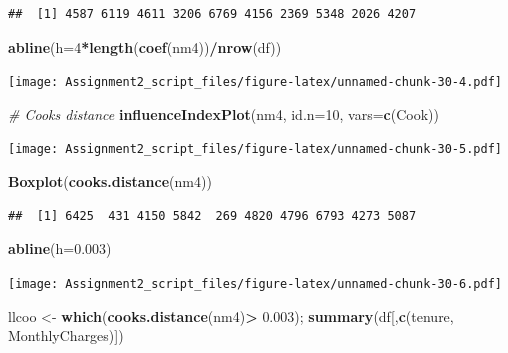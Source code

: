 \documentclass[
]{article}
\newenvironment{Shaded}{\begin{snugshade}}{\end{snugshade}}
\newcommand{\AttributeTok}[1]{\textcolor[rgb]{0.13,0.29,0.53}{#1}}
\newcommand{\CommentTok}[1]{\textcolor[rgb]{0.56,0.35,0.01}{\textit{#1}}}
\newcommand{\DecValTok}[1]{\textcolor[rgb]{0.00,0.00,0.81}{#1}}
\newcommand{\FloatTok}[1]{\textcolor[rgb]{0.00,0.00,0.81}{#1}}
\newcommand{\FunctionTok}[1]{\textcolor[rgb]{0.13,0.29,0.53}{\textbf{#1}}}
\newcommand{\NormalTok}[1]{#1}
\newcommand{\OtherTok}[1]{\textcolor[rgb]{0.56,0.35,0.01}{#1}}
\newcommand{\SpecialCharTok}[1]{\textcolor[rgb]{0.81,0.36,0.00}{\textbf{#1}}}
\newcommand{\StringTok}[1]{\textcolor[rgb]{0.31,0.60,0.02}{#1}}
\begin{document}
\begin{verbatim}
##  [1] 4587 6119 4611 3206 6769 4156 2369 5348 2026 4207
\end{verbatim}

\begin{Shaded}
\begin{Highlighting}[]
\FunctionTok{abline}\NormalTok{(}\AttributeTok{h=}\DecValTok{4}\SpecialCharTok{*}\FunctionTok{length}\NormalTok{(}\FunctionTok{coef}\NormalTok{(nm4))}\SpecialCharTok{/}\FunctionTok{nrow}\NormalTok{(df))}
\end{Highlighting}
\end{Shaded}

\texttt{[image: Assignment2\_script\_files/figure-latex/unnamed-chunk-30-4.pdf]}

\begin{Shaded}
\begin{Highlighting}[]
\CommentTok{\# Cooks distance}
\FunctionTok{influenceIndexPlot}\NormalTok{(nm4, }\AttributeTok{id.n=}\DecValTok{10}\NormalTok{, }\AttributeTok{vars=}\FunctionTok{c}\NormalTok{(}\StringTok{\textquotesingle{}Cook\textquotesingle{}}\NormalTok{))}
\end{Highlighting}
\end{Shaded}

\texttt{[image: Assignment2\_script\_files/figure-latex/unnamed-chunk-30-5.pdf]}

\begin{Shaded}
\begin{Highlighting}[]
\FunctionTok{Boxplot}\NormalTok{(}\FunctionTok{cooks.distance}\NormalTok{(nm4))}
\end{Highlighting}
\end{Shaded}

\begin{verbatim}
##  [1] 6425  431 4150 5842  269 4820 4796 6793 4273 5087
\end{verbatim}

\begin{Shaded}
\begin{Highlighting}[]
\FunctionTok{abline}\NormalTok{(}\AttributeTok{h=}\FloatTok{0.003}\NormalTok{)}
\end{Highlighting}
\end{Shaded}

\texttt{[image: Assignment2\_script\_files/figure-latex/unnamed-chunk-30-6.pdf]}

\begin{Shaded}
\begin{Highlighting}[]
\NormalTok{llcoo }\OtherTok{\textless{}{-}} \FunctionTok{which}\NormalTok{(}\FunctionTok{cooks.distance}\NormalTok{(nm4)}\SpecialCharTok{\textgreater{}} \FloatTok{0.003}\NormalTok{);}
\FunctionTok{summary}\NormalTok{(df[,}\FunctionTok{c}\NormalTok{(}\StringTok{\textquotesingle{}tenure\textquotesingle{}}\NormalTok{, }\StringTok{\textquotesingle{}MonthlyCharges\textquotesingle{}}\NormalTok{)])}
\end{Highlighting}
\end{Shaded}
\end{document}
